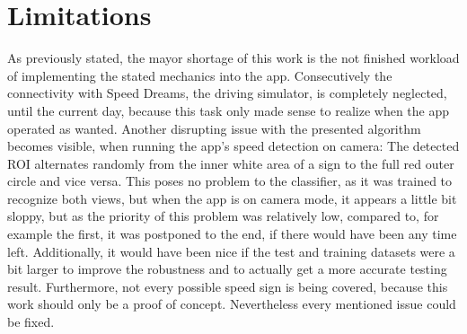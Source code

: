 
\chapter{Limitations}\label{chapter:limitations}
As previously stated, the mayor shortage of this work is the not finished workload of implementing the stated mechanics into the app. \newline
Consecutively the connectivity with Speed Dreams, the driving simulator, is completely neglected, until the current day, because this task only made sense to realize when the app operated as wanted.\newline
Another disrupting issue with the presented algorithm becomes visible, when running the app's speed detection on camera: The detected ROI alternates randomly from the inner white area of a sign to the full red outer circle and vice versa. This poses no problem to the classifier, as it was trained to recognize both views, but when the app is on camera mode, it appears a little bit sloppy, but as the priority of this problem was relatively low, compared to, for example the first, it was postponed to the end, if there would have been any time left.\newline  
Additionally, it would have been nice if the test and training datasets were a bit larger to improve the robustness and to actually get a more accurate testing result. Furthermore, not every possible speed sign is being covered, because this work should only be a proof of concept.  
Nevertheless every mentioned issue could be fixed.



